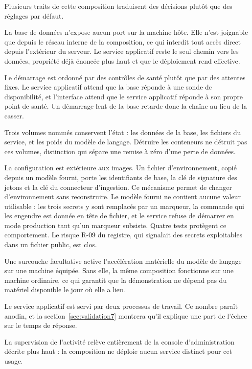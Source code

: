 Plusieurs traits de cette composition traduisent des décisions plutôt que des réglages par défaut.

La base de données n'expose aucun port sur la machine hôte. Elle n'est joignable que depuis le
réseau interne de la composition, ce qui interdit tout accès direct depuis l'extérieur du serveur.
Le service applicatif reste le seul chemin vers les données, propriété déjà énoncée plus haut et que le déploiement rend effective.

Le démarrage est ordonné par des contrôles de santé plutôt que par des attentes fixes. Le service
applicatif attend que la base réponde à une sonde de disponibilité, et l'interface attend que le
service applicatif réponde à son propre point de santé. Un démarrage lent de la base retarde donc
la chaîne au lieu de la casser.

Trois volumes nommés conservent l'état : les données de la base, les fichiers du service, et les
poids du modèle de langage. Détruire les conteneurs ne détruit pas ces volumes, distinction qui
sépare une remise à zéro d'une perte de données.

La configuration est extérieure aux images. Un fichier d'environnement, copié depuis un modèle
fourni, porte les identifiants de base, la clé de signature des jetons et la clé du connecteur
d'ingestion. Ce mécanisme permet de changer d'environnement sans reconstruire. Le modèle fourni ne
contient aucune valeur utilisable : les trois secrets y sont remplacés par un marqueur, la commande
qui les engendre est donnée en tête de fichier, et le service refuse de démarrer en mode production
tant qu'un marqueur subsiste. Quatre tests protègent ce comportement. Le risque R-09 du registre,
qui signalait des secrets exploitables dans un fichier public, est clos.

Une surcouche facultative active l'accélération matérielle du modèle de langage sur une machine
équipée. Sans elle, la même composition fonctionne sur une machine ordinaire, ce qui garantit que
la démonstration ne dépend pas du matériel disponible le jour où elle a lieu.

Le service applicatif est servi par deux processus de travail. Ce nombre paraît anodin, et la
section~\ref{sec:validation7} montrera qu'il explique une part de l'échec sur le temps de réponse.

La supervision de l'activité relève entièrement de la console d'administration décrite plus haut : la composition ne déploie aucun service distinct pour cet usage.


